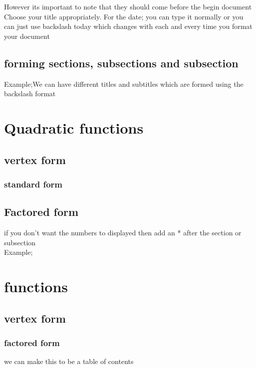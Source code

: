 \documentclass[a4paper,12pt]{article}
\begin{document}
\normalsize
However its important to note that they should come before the begin document
Choose your title appropriately.
For the date; you can type it normally or you can just use backslash today which changes with each and every time you format your document

\subsection{forming sections, subsections and subsection}
Example;We can have different titles and subtitles which are formed using the backslash format 
\section{Quadratic functions}
\subsection{vertex form}
\subsubsection{standard form}
\subsection{Factored form}
if you don't want the numbers to displayed then add an *  after the section or subsection\\
Example;
\tableofcontents
\maketitle
\section{functions}
\subsection{vertex form}
\subsubsection*{factored form}
we can make this to be a table of contents
\end{document}
